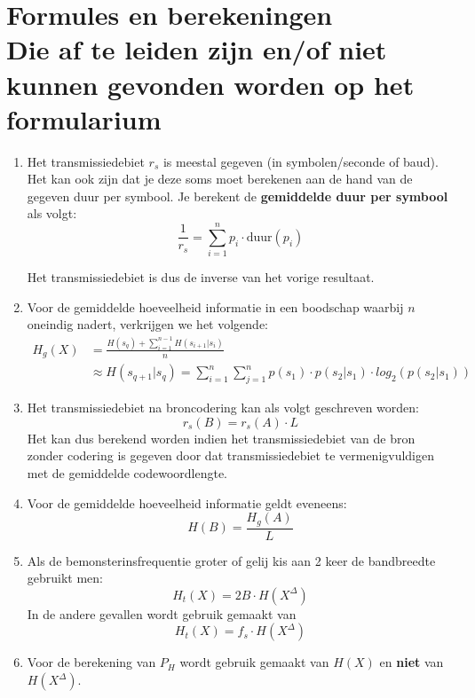 \documentclass[12pt,a4paper]{article}
\begin{document}
\section*{Formules en berekeningen\\ \scriptsize{Die af te leiden zijn en/of niet kunnen gevonden worden op het formularium}}
\begin{enumerate}
	\item Het transmissiedebiet $r_s$ is meestal gegeven (in symbolen/seconde of baud). Het kan ook zijn dat je deze soms moet berekenen aan de hand van de gegeven duur per symbool. Je berekent de \textbf{gemiddelde duur per symbool} als volgt:
	      $$\frac{1}{r_s} = \sum_{i=1}^n p_i \cdot \text{duur}(p_i)$$
	      
	      Het transmissiedebiet is dus de inverse van het vorige resultaat.
	      
	\item Voor de gemiddelde hoeveelheid informatie in een boodschap waarbij $n$ oneindig nadert, verkrijgen we het volgende:
	      \begin{align*}
	      	H_g(X) & = \frac{H(s_q) + \sum_{i=1}^{n-1} H(s_{i+1}|s_i)}{n}                                               \\
	      	       & \approx H(s_{q+1}|s_q) = \sum_{i=1}^n \sum_{j=1}^n p(s_1) \cdot p(s_2|s_1) \cdot log_2(p(s_2|s_1)) 
	      \end{align*}
	      
	\item Het transmissiedebiet na broncodering kan als volgt geschreven worden:
	      $$r_s(B) = r_s(A) \cdot L$$
	      Het kan dus berekend worden indien het transmissiedebiet van de bron zonder codering is gegeven door dat transmissiedebiet te vermenigvuldigen met de gemiddelde codewoordlengte.
	      
	\item Voor de gemiddelde hoeveelheid informatie geldt eveneens:
	      $$H(B) = \frac{H_g(A)}{L}$$
	      
	\item Als de bemonsterinsfrequentie groter of gelij kis aan 2 keer de bandbreedte gebruikt men:
	      $$H_t(X) = 2B \cdot H(X^{\Delta})$$
	      In de andere gevallen wordt gebruik gemaakt van 
	      $$H_t(X) = f_s \cdot H(X^{\Delta})$$
	      
	\item Voor de berekening van $P_H$ wordt gebruik gemaakt van $H(X)$ en \textbf{niet} van $H(X^{\Delta})$.
	      

\end{enumerate}
\end{document}
